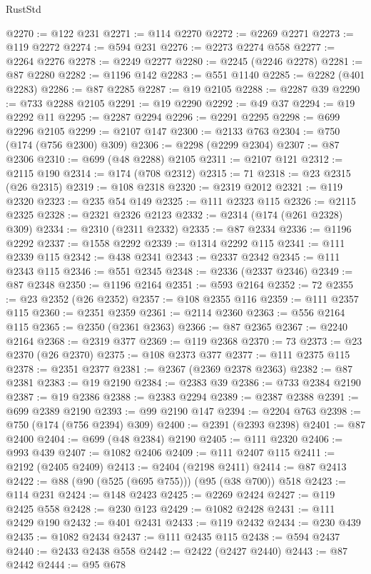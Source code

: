 \begin{lexlean}{RustStd}
\begin{coremodule}
@2270 := @122 @231
@2271 := @114 @2270
@2272 := @2269 @2271
@2273 := @119 @2272
@2274 := @594 @231
@2276 := @2273 @2274 @558
@2277 := @2264 @2276
@2278 := @2249 @2277
@2280 := @2245 (@2246 @2278)
@2281 := @87 @2280
@2282 := @1196 @142
@2283 := @551 @1140
@2285 := @2282 (@401 @2283)
@2286 := @87 @2285
@2287 := @19 @2105
@2288 := @2287 @39
@2290 := @733 @2288 @2105
@2291 := @19 @2290
@2292 := @49 @37
@2294 := @19 @2292 @11
@2295 := @2287 @2294
@2296 := @2291 @2295
@2298 := @699 @2296 @2105
@2299 := @2107 @147
@2300 := @2133 @763
@2304 := @750 (@174 (@756 @2300) @309)
@2306 := @2298 (@2299 @2304)
@2307 := @87 @2306
@2310 := @699 (@48 @2288) @2105
@2311 := @2107 @121
@2312 := @2115 @190
@2314 := @174 (@708 @2312)
@2315 := 71
@2318 := @23 @2315 (@26 @2315)
@2319 := @108 @2318
@2320 := @2319 @2012
@2321 := @119 @2320
@2323 := @235 @54 @149
@2325 := @111 @2323 @115
@2326 := @2115 @2325
@2328 := @2321 @2326 @2123
@2332 := @2314 (@174 (@261 @2328) @309)
@2334 := @2310 (@2311 @2332)
@2335 := @87 @2334
@2336 := @1196 @2292
@2337 := @1558 @2292
@2339 := @1314 @2292 @115
@2341 := @111 @2339 @115
@2342 := @438 @2341
@2343 := @2337 @2342
@2345 := @111 @2343 @115
@2346 := @551 @2345
@2348 := @2336 (@2337 @2346)
@2349 := @87 @2348
@2350 := @1196 @2164
@2351 := @593 @2164
@2352 := 72
@2355 := @23 @2352 (@26 @2352)
@2357 := @108 @2355 @116
@2359 := @111 @2357 @115
@2360 := @2351 @2359
@2361 := @2114 @2360
@2363 := @556 @2164 @115
@2365 := @2350 (@2361 @2363)
@2366 := @87 @2365
@2367 := @2240 @2164
@2368 := @2319 @377
@2369 := @119 @2368
@2370 := 73
@2373 := @23 @2370 (@26 @2370)
@2375 := @108 @2373 @377
@2377 := @111 @2375 @115
@2378 := @2351 @2377
@2381 := @2367 (@2369 @2378 @2363)
@2382 := @87 @2381
@2383 := @19 @2190
@2384 := @2383 @39
@2386 := @733 @2384 @2190
@2387 := @19 @2386
@2388 := @2383 @2294
@2389 := @2387 @2388
@2391 := @699 @2389 @2190
@2393 := @99 @2190 @147
@2394 := @2204 @763
@2398 := @750 (@174 (@756 @2394) @309)
@2400 := @2391 (@2393 @2398)
@2401 := @87 @2400
@2404 := @699 (@48 @2384) @2190
@2405 := @111 @2320
@2406 := @993 @439
@2407 := @1082 @2406
@2409 := @111 @2407 @115
@2411 := @2192 (@2405 @2409)
@2413 := @2404 (@2198 @2411)
@2414 := @87 @2413
@2422 := @88 (@90 (@525 (@695 @755))) (@95 (@38 @700)) @518
@2423 := @114 @231
@2424 := @148 @2423
@2425 := @2269 @2424
@2427 := @119 @2425 @558
@2428 := @230 @123
@2429 := @1082 @2428
@2431 := @111 @2429 @190
@2432 := @401 @2431
@2433 := @119 @2432
@2434 := @230 @439
@2435 := @1082 @2434
@2437 := @111 @2435 @115
@2438 := @594 @2437
@2440 := @2433 @2438 @558
@2442 := @2422 (@2427 @2440)
@2443 := @87 @2442
@2444 := @95 @678

\end{coremodule}
\end{lexlean}
